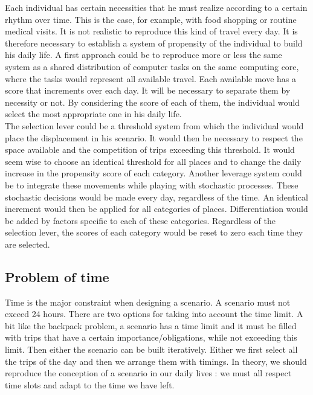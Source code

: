 Each individual has certain necessities that he must realize according to a certain rhythm over time. This is the case, for example, with food shopping or routine medical visits. It is not realistic to reproduce this kind of travel every day. It is therefore necessary to establish a system of propensity of the individual to build his daily life. A first approach could be to reproduce more or less the same system as a shared distribution of computer tasks on the same computing core, where the tasks would represent all available travel. Each available move has a score that increments over each day. It will be necessary to separate them by necessity or not. By considering the score of each of them, the individual would select the most appropriate one in his daily life.\\

The selection lever could be a threshold system from which the individual would place the displacement in his scenario. It would then be necessary to respect the space available and the competition of trips exceeding this threshold. It would seem wise to choose an identical threshold for all places and to change the daily increase in the propensity score of each category. Another leverage system could be to integrate these movements while playing with stochastic processes. These stochastic decisions would be made every day, regardless of the time. An identical increment would then be applied for all categories of places. Differentiation would be added by factors specific to each of these categories. Regardless of the selection lever, the scores of each category would be reset to zero each time they are selected.\\

\subsection{Problem of time}

Time is the major constraint when designing a scenario. A scenario must not exceed 24 hours. There are two options for taking into account the time limit. A bit like the backpack problem, a scenario has a time limit and it must be filled with trips that have a certain importance/obligations, while not exceeding this limit. Then either the scenario can be built iteratively. Either we first select all the trips of the day and then we arrange them with timings. In theory, we should reproduce the conception of a scenario in our daily lives : we must all respect time slots and adapt to the time we have left.\\

